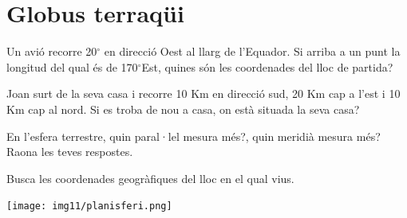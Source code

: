 \section{Globus terraqüi}

\begin{mylist}
\exer Un avió recorre 20${}^\circ$ en direcció Oest al llarg de l'Equador. Si arriba a un punt la longitud del qual és de 170${}^\circ$Est, quines són les coordenades del lloc de partida?


\exer  Joan surt de la seva casa i recorre 10 Km en direcció sud, 20 Km cap a l'est i 10 Km cap al nord. Si es troba de nou a casa, on està situada la seva casa?


\exer  En l'esfera terrestre, quin paral·lel mesura més?, quin meridià mesura més? Raona les teves respostes.


\exer  Busca les coordenades geogràfiques del lloc en el qual vius.


\begin{center}
 \texttt{[image: img11/planisferi.png]} 
\end{center} 

 
\end{mylist}



